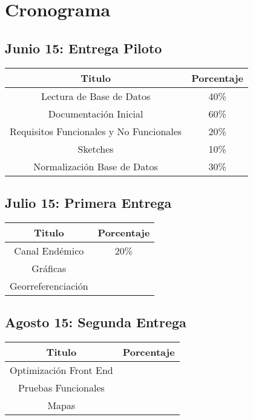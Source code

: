 \section{Cronograma}

\subsection{Junio 15: Entrega Piloto}

\begin{center}
\begin{tabular}{|c|c|}
\hline 
Titulo & Porcentaje \\ \hline
\hline
Lectura de Base de Datos & 40\% \\ \hline
Documentación Inicial & 60\% \\ \hline
Requisitos Funcionales y No Funcionales & 20\%\\ \hline
Sketches & 10\%\\ \hline
Normalización Base de Datos & 30\%\\ \hline

\end{tabular}
\end{center}

\subsection{Julio 15: Primera Entrega}

\begin{center}
\begin{tabular}{|c|c|}
\hline 
Titulo & Porcentaje \\ \hline
\hline
Canal Endémico & 20\% \\ \hline
Gráficas & \\ \hline
Georreferenciación & \\ \hline
\end{tabular}
\end{center}


\subsection{Agosto 15: Segunda Entrega }


\begin{center}
\begin{tabular}{|c|c|}
\hline 
Titulo & Porcentaje \\ \hline
\hline
Optimización Front End & \\ \hline
Pruebas Funcionales & \\ \hline
Mapas & \\ \hline
\end{tabular}
\end{center}

